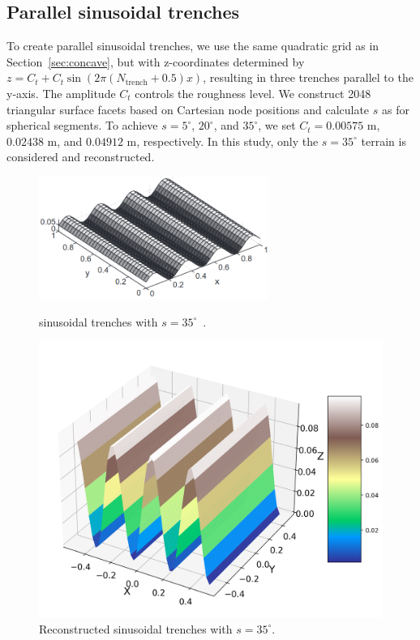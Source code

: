 \documentclass{optica-article}
\begin{document}
\subsection{Parallel sinusoidal trenches}
To create parallel sinusoidal trenches, we use the same quadratic grid as in Section~\ref{sec:concave},
 but with z-coordinates determined by $z = C_t + C_t \sin(2\pi(N_{\text{trench}} + 0.5)x)$, 
 resulting in three trenches parallel to the y-axis. The amplitude $C_t$ controls the roughness level. 
We construct 2048 triangular surface facets based on Cartesian node positions and calculate $s$ as for 
spherical segments. To achieve $s = 5^\circ$, $20^\circ$, and $35^\circ$, we set $C_t = 0.00575$ m, $0.02438$ m, and $0.04912$ m, respectively. 
In this study, only the $s = 35^\circ$ terrain is considered and reconstructed.

\begin{figure}[H]
    \centering
	\hspace{-1cm}
    \begin{minipage}{0.45\textwidth}
        \centering
        \includegraphics[width=\textwidth, height = 4cm]{./Figures/sin_d.png} 
        \caption{sinusoidal trenches with $s=35^\circ$~\cite{DAVIDSSON20151}.}
        \label{fig:sin_d}
    \end{minipage}\hfill
	\hspace{-0.8cm}
    \begin{minipage}{0.45\textwidth}
        \centering
        \includegraphics[width=\textwidth]{./Figures/sin.png} 
        \caption{Reconstructed sinusoidal trenches  with $s = 35^\circ$.}
        \label{fig:sin}
    \end{minipage}
\end{figure}
\end{document}

